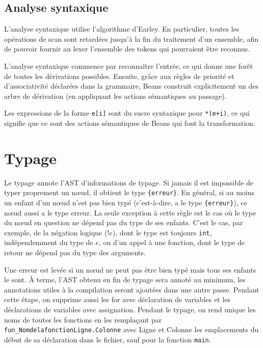 \documentclass{scrartcl}
\begin{document}
\subsection*{Analyse syntaxique}
L'analyse syntaxique utilise l'algorithme d'Earley. En particulier, toutes les
opérations de scan sont retardées jusqu'à la fin du traitement d'un ensemble,
afin de pouvoir fournir au lexer l'ensemble des tokens qui pourraient être
reconnus.\par
L'analyse syntaxique commence par reconnaître l'entrée, ce qui donne une forêt
de toutes les dérivations possibles. Ensuite, grâce aux règles de priorité et
d'associativité déclarées dans la grammaire, Beans construit explicitement
un des arbre de dérivation (en appliquant les actions sémantiques au passage).\par
Les expressions de la forme \verb|e[i]| sont du sucre syntaxique pour \verb|*(e+i)|,
ce qui signifie que ce sont des actions sémantiques de Beans qui font la
transformation.

\section*{Typage}
Le typage annote l'AST d'informations de typage. Si jamais il est impossible
de typer proprement un n\oe{}ud, il obtient le type \verb|{erreur}|. En général,
si au moins un enfant d'un n\oe{}ud n'est pas bien typé (c'est-à-dire, a le type
\verb|{erreur}|), ce n\oe{}ud aussi a le type erreur. La seule exception à cette règle
est le cas où le type du n\oe{}ud en question ne dépend pas du type de ses enfants.
C'est le cas, par exemple, de la négation logique ($!e$), dont le type est
toujours \verb|int|, indépendemment du type de $e$, ou d'un appel à une fonction,
dont le type de retour ne dépend pas du type des arguments.\par
Une erreur est levée si un n\oe{}ud ne peut pas être bien typé mais tous ses enfants
le sont. À terme, l'AST obtenu en fin de typage sera annoté au minimum, les annotations
utiles à la compilation seront ajoutées dans une autre passe. Pendant cette étape,
on supprime aussi les for avec déclaration de variables et les déclarations de variables
avec assignation. Pendant le typage, on rend unique les noms de toutes
les fonctions en les remplaçant par \verb|fun_NomdelafonctionLigne.Colonne| avec Ligne et Colonne les
emplacements du début de sa déclaration dans le fichier, sauf pour la fonction \verb|main|.
\end{document}
